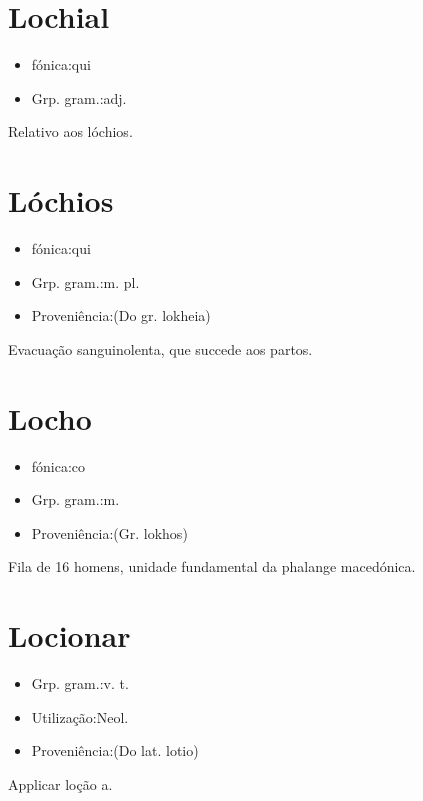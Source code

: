 \section{Lochial}
\begin{itemize}
\item {fónica:qui}
\end{itemize}
\begin{itemize}
\item {Grp. gram.:adj.}
\end{itemize}
Relativo aos lóchios.
\section{Lóchios}
\begin{itemize}
\item {fónica:qui}
\end{itemize}
\begin{itemize}
\item {Grp. gram.:m. pl.}
\end{itemize}
\begin{itemize}
\item {Proveniência:(Do gr. \textunderscore lokheia\textunderscore )}
\end{itemize}
Evacuação sanguinolenta, que succede aos partos.
\section{Locho}
\begin{itemize}
\item {fónica:co}
\end{itemize}
\begin{itemize}
\item {Grp. gram.:m.}
\end{itemize}
\begin{itemize}
\item {Proveniência:(Gr. \textunderscore lokhos\textunderscore )}
\end{itemize}
Fila de 16 homens, unidade fundamental da phalange macedónica.
\section{Locionar}
\begin{itemize}
\item {Grp. gram.:v. t.}
\end{itemize}
\begin{itemize}
\item {Utilização:Neol.}
\end{itemize}
\begin{itemize}
\item {Proveniência:(Do lat. \textunderscore lotio\textunderscore )}
\end{itemize}
Applicar loção a.

